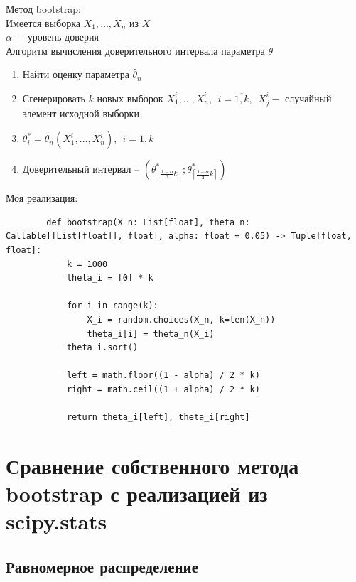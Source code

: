 \documentclass[a4paper,14pt]{extarticle}
\begin{document}
    Метод bootstrap: \\
    Имеется выборка $X_1, \ldots, X_n$ из $X$ \\
    $\alpha -$ уровень доверия \\
    Алгоритм вычисления доверительного интервала параметра $\theta$ \\
    \begin{enumerate}
        \item Найти оценку параметра $\widehat{\theta}_n$
        \item Сгенерировать $k$ новых выборок $X_1^i, \ldots, X_n^i, ~~ i = \overline{1, k}, ~~ X_j^i -$ случайный элемент исходной выборки
        \item $\theta_i^* = \widehat{\theta}_n (X_1^i, \ldots, X_n^i), ~~ i = \overline{1, k}$
        \item Доверительный интервал -- $\displaystyle \left( \theta_{\left\lfloor {\textstyle \frac{1 - \alpha}{2}} k \right\rfloor}^*; \theta_{\left\lceil {\textstyle \frac{1 + \alpha}{2}} k \right\rceil}^* \right)$
    \end{enumerate}

    Моя реализация:
    \begin{verbatim}
        def bootstrap(X_n: List[float], theta_n: Callable[[List[float]], float], alpha: float = 0.05) -> Tuple[float, float]:
            k = 1000
            theta_i = [0] * k
            
            for i in range(k):
                X_i = random.choices(X_n, k=len(X_n))
                theta_i[i] = theta_n(X_i)
            theta_i.sort()
            
            left = math.floor((1 - alpha) / 2 * k)
            right = math.ceil((1 + alpha) / 2 * k)
            
            return theta_i[left], theta_i[right]
    \end{verbatim}
    
    \section{Сравнение собственного метода bootstrap с реализацией из scipy.stats}
    \subsection{Равномерное распределение}
\end{document}
